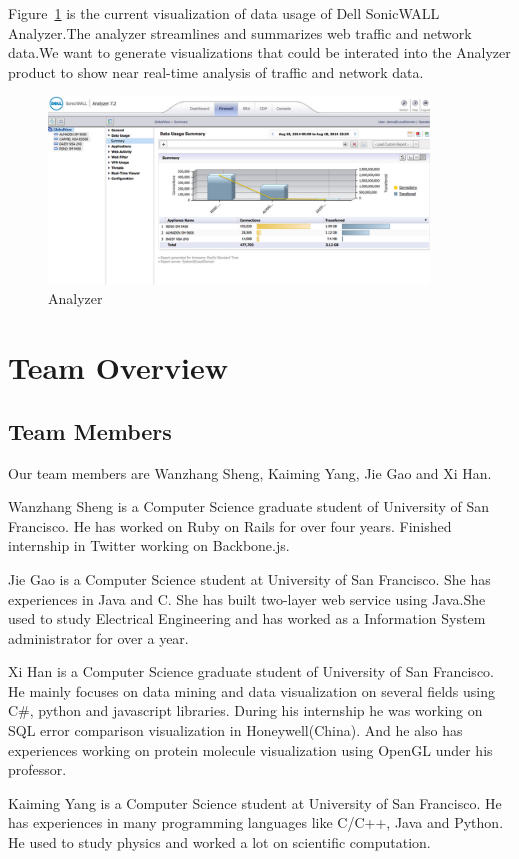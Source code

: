 \documentclass[paper=a4, fontsize=11pt]{report} %
\begin{document}
\begin{description}[style=nextline]
    \item[\href{http://www.sonicwall.com/us/en/products/Firewall-Analyzer.html}{Analyzer}]
    Figure~\ref{fig:analyzer} is the current visualization of data usage of Dell SonicWALL Analyzer.The analyzer streamlines and summarizes web traffic and network data.We want to generate visualizations that could be interated into the Analyzer product to show near real-time analysis of traffic and network data.
	   \begin{figure}[H]
        \begin{center}
            \includegraphics[width=0.9\textwidth]{analyzer.png}
        \end{center}
        \caption{Analyzer}\label{fig:analyzer}
    \end{figure}

\section{Team Overview} %
\label{sec:team_ovierview}
\subsection{Team Members} %
\label{sub:team_members}
Our team members are Wanzhang Sheng, Kaiming Yang, Jie Gao and Xi Han.

Wanzhang Sheng is a Computer Science graduate student of University of San Francisco. He has worked on Ruby on Rails for over four years. Finished internship in Twitter working on Backbone.js.

Jie Gao is a Computer Science student at University of San Francisco. She has experiences in Java and C. She has built two-layer web service using Java.She used to study Electrical Engineering and has worked as a Information System administrator for over a year.

Xi Han is a Computer Science graduate student of University of San Francisco. He mainly focuses on data mining and data visualization on several fields using C\#, python and javascript libraries. During his internship he was working on SQL error comparison visualization in Honeywell(China). And he also has experiences working on protein molecule visualization using OpenGL under his professor. 

Kaiming Yang is a Computer Science student at University of San Francisco. He has experiences in many programming languages like C/C++, Java and Python. He used to study physics and worked a lot on scientific computation.


\end{description} 
\end{document}
